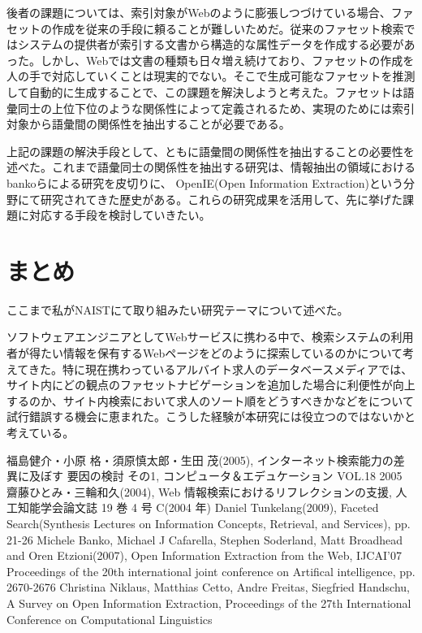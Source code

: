 \documentclass[a4j,12pt, twocolumn]{jarticle}
\begin{document}
 後者の課題については、索引対象がWebのように膨張しつづけている場合、ファセットの作成を従来の手段に頼ることが難しいためだ。従来のファセット検索ではシステムの提供者が索引する文書から構造的な属性データを作成する必要があった。しかし、Webでは文書の種類も日々増え続けており、ファセットの作成を人の手で対応していくことは現実的でない。そこで生成可能なファセットを推測して自動的に生成することで、この課題を解決しようと考えた。ファセットは語彙同士の上位下位のような関係性によって定義されるため、実現のためには索引対象から語彙間の関係性を抽出することが必要である。

上記の課題の解決手段として、ともに語彙間の関係性を抽出することの必要性を述べた。これまで語彙同士の関係性を抽出する研究は、情報抽出の領域におけるbankoらによる研究\cite{banko}を皮切りに、 OpenIE(Open Information Extraction)という分野にて研究されてきた歴史がある\cite{niklaus}。これらの研究成果を活用して、先に挙げた課題に対応する手段を検討していきたい。

\section{まとめ}
ここまで私がNAISTにて取り組みたい研究テーマについて述べた。

 ソフトウェアエンジニアとしてWebサービスに携わる中で、検索システムの利用者が得たい情報を保有するWebページをどのように探索しているのかについて考えてきた。特に現在携わっているアルバイト求人のデータベースメディアでは、サイト内にどの観点のファセットナビゲーションを追加した場合に利便性が向上するのか、サイト内検索において求人のソート順をどうすべきかなどをについて試行錯誤する機会に恵まれた。こうした経験が本研究には役立つのではないかと考えている。

\begin{thebibliography}{9}
   福島健介・小原 格・須原慎太郎・生田 茂(2005), インターネット検索能力の差異に及ぼす 要因の検討 その1, コンピュータ＆エデュケーション VOL.18 2005
   齋藤ひとみ・三輪和久(2004),  Web 情報検索におけるリフレクションの支援, 人工知能学会論文誌 19 巻 4 号 C(2004 年)
  Daniel Tunkelang(2009), Faceted Search(Synthesis Lectures on Information Concepts, Retrieval, and Services), pp. 21-26
  Michele Banko, Michael J Cafarella, Stephen Soderland, Matt Broadhead and Oren Etzioni(2007), Open Information Extraction from the Web, IJCAI'07 Proceedings of the 20th international joint conference on Artifical intelligence, pp. 2670-2676 
  Christina Niklaus, Matthias Cetto, Andre Freitas, Siegfried Handschu, A Survey on Open Information Extraction, Proceedings of the 27th International Conference on Computational Linguistics
\end{thebibliography}
\end{document}
